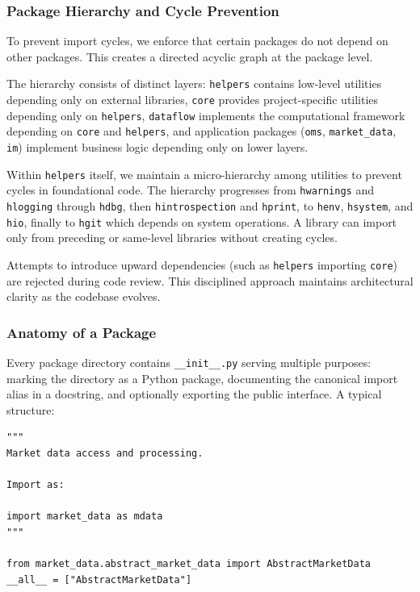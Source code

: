 \subsubsection{Package Hierarchy and Cycle Prevention}

To prevent import cycles, we enforce that certain packages do not depend
on other packages. This creates a directed acyclic graph at the package
level.

The hierarchy consists of distinct layers: \texttt{helpers} contains
low-level utilities depending only on external libraries, \texttt{core}
provides project-specific utilities depending only on \texttt{helpers},
\texttt{dataflow} implements the computational framework depending on
\texttt{core} and \texttt{helpers}, and application packages
(\texttt{oms}, \texttt{market\_data}, \texttt{im}) implement business
logic depending only on lower layers.

Within \texttt{helpers} itself, we maintain a micro-hierarchy among
utilities to prevent cycles in foundational code. The hierarchy progresses
from \texttt{hwarnings} and \texttt{hlogging} through \texttt{hdbg},
then \texttt{hintrospection} and \texttt{hprint}, to \texttt{henv},
\texttt{hsystem}, and \texttt{hio}, finally to \texttt{hgit} which
depends on system operations. A library can import only from preceding
or same-level libraries without creating cycles.

Attempts to introduce upward dependencies (such as \texttt{helpers}
importing \texttt{core}) are rejected during code review. This disciplined
approach maintains architectural clarity as the codebase evolves.

\subsubsection{Anatomy of a Package}

Every package directory contains \texttt{\_\_init\_\_.py} serving
multiple purposes: marking the directory as a Python package, documenting
the canonical import alias in a docstring, and optionally exporting
the public interface. A typical structure:

\begin{verbatim}
"""
Market data access and processing.

Import as:

import market_data as mdata
"""

from market_data.abstract_market_data import AbstractMarketData
__all__ = ["AbstractMarketData"]
\end{verbatim}

